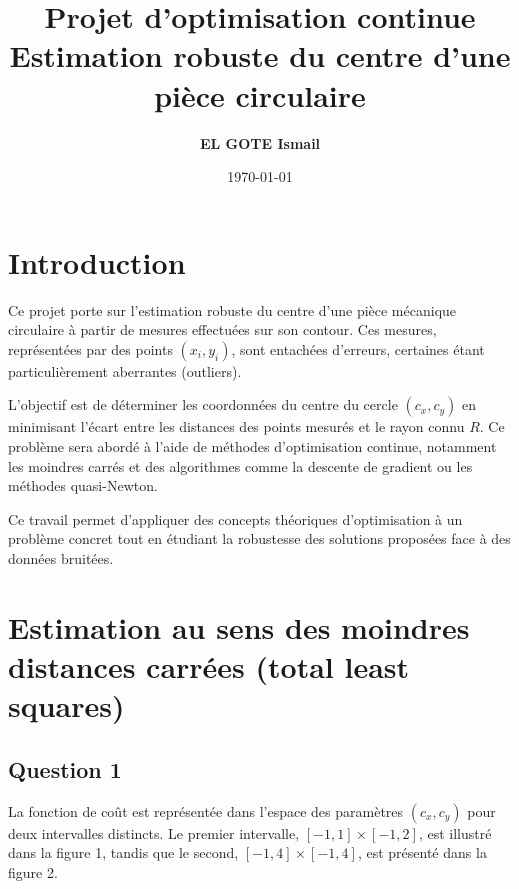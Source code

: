 \documentclass[12pt]{article}
\title{
  \vspace{2cm}
  \textbf{\huge Projet d'optimisation continue}\\ 
  \textbf{\Large Estimation robuste du centre d’une pièce circulaire}
  \vspace{2cm}
}
\author{\textbf{EL GOTE Ismail}}
\date{\today}
\begin{document}
\maketitle
\newpage

\section*{Introduction}

Ce projet porte sur l'estimation robuste du centre d'une pièce mécanique circulaire à partir de mesures effectuées sur son contour. Ces mesures, représentées par des points \((x_i, y_i)\), sont entachées d'erreurs, certaines étant particulièrement aberrantes (outliers). 

L'objectif est de déterminer les coordonnées du centre du cercle \((c_x, c_y)\) en minimisant l'écart entre les distances des points mesurés et le rayon connu \(R\). Ce problème sera abordé à l'aide de méthodes d'optimisation continue, notamment les moindres carrés et des algorithmes comme la descente de gradient ou les méthodes quasi-Newton.

Ce travail permet d'appliquer des concepts théoriques d'optimisation à un problème concret tout en étudiant la robustesse des solutions proposées face à des données bruitées.

\section{Estimation au sens des moindres distances carrées (total least squares)}

\subsection{Question 1}

La fonction de coût est représentée dans l'espace des paramètres \((c_x, c_y)\) pour deux intervalles distincts. Le premier intervalle, \([-1, 1] \times [-1, 2]\), est illustré dans la figure 1, tandis que le second, \([-1, 4] \times [-1, 4]\), est présenté dans la figure 2.
\end{document}
